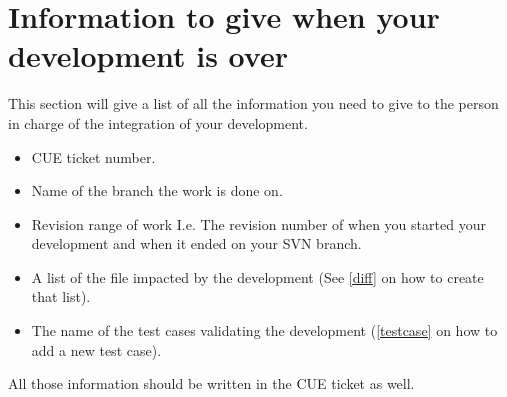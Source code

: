 \chapter{Information to give when your development is over}
This section will give a list of all the information you need to give to the
person in charge of the integration of your development.
%
\begin{itemize}
\item CUE ticket number.
\item Name of the branch the work is done on.
\item Revision range of work I.e. The revision number of when you started your
  development and when it ended on your SVN branch.
\item A list of the file impacted by the development (See \ref{diff} on how to
create that list).
\item The name of the test cases validating the development (\ref{testcase} on
  how to add a new test case).
\end{itemize}

All those information should be written in the CUE ticket as well.
